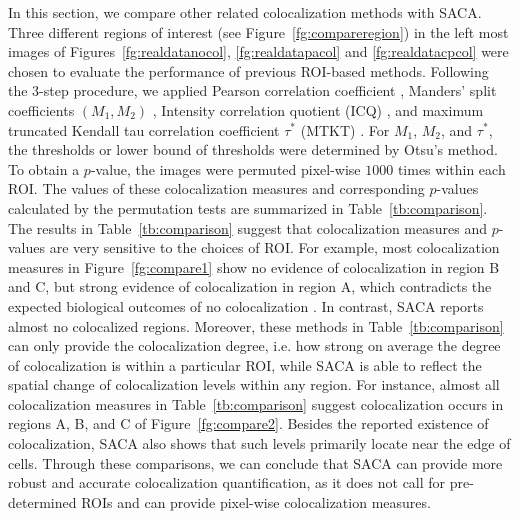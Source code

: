 \documentclass[10pt,twocolumn,twoside]{IEEEtran}
\begin{document}
In this section, we compare other related colocalization methods with SACA. Three different regions of interest (see Figure~\ref{fg:compareregion}) in the left most images of Figures~\ref{fg:realdatanocol}, \ref{fg:realdatapacol} and \ref{fg:realdatacpcol} were chosen to evaluate the performance of previous ROI-based methods. Following the 3-step procedure, we applied Pearson correlation coefficient \cite{manders1992dynamics}, Manders' split coefficients $(M_1,M_2)$ \cite{manders1993measurement}, Intensity correlation quotient (ICQ) \cite{Li04}, and maximum truncated Kendall tau correlation coefficient $\tau^\ast$ (MTKT) \cite{wang2017}. For $M_1$, $M_2$, and $\tau^\ast$, the thresholds or lower bound of thresholds were determined by Otsu's method. To obtain a $p$-value, the images were permuted pixel-wise $1000$ times within each ROI. The values of these colocalization measures and corresponding $p$-values calculated by the permutation tests are summarized in Table~\ref{tb:comparison}. The results in Table~\ref{tb:comparison} suggest that colocalization measures and $p$-values are very sensitive to the choices of ROI. For example, most colocalization measures in Figure~\ref{fg:compare1} show no evidence of colocalization in region B and C, but strong evidence of colocalization in region A, which contradicts the expected biological outcomes of no colocalization \citep[see more discussion on Simpson's paradox][]{simpson1951interpretation}. In contrast, SACA reports almost no colocalized regions. Moreover, these methods in Table~\ref{tb:comparison} can only provide the colocalization degree, i.e. how strong on average the degree of colocalization is within a particular ROI, while SACA is able to reflect the spatial change of colocalization levels within any region. For instance, almost all colocalization measures in Table~\ref{tb:comparison} suggest colocalization occurs in regions A, B, and C of Figure~\ref{fg:compare2}. Besides the reported existence of colocalization, SACA also shows that such levels primarily locate near the edge of cells. Through these comparisons, we can conclude that SACA can provide more robust and accurate colocalization quantification, as it does not call for pre-determined ROIs and can provide pixel-wise colocalization measures. 
\end{document}
